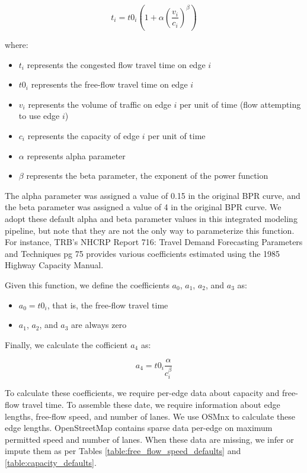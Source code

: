 \bigskip
\begin{equation}
    t_i = t0_i (1 + \alpha (\frac{v_i}{c_i}) ^ \beta)
    \label{eq:bpr_function}
\end{equation}

\bigskip
where:

\bigskip
\begin{itemize}
    \item $t_i$ represents the congested flow travel time on edge $i$
    \item $t0_i$ represents the free-flow travel time on edge $i$
    \item $v_i$ represents the volume of traffic on edge $i$ per unit of time (flow attempting to use edge $i$)
    \item $c_i$ represents the capacity of edge $i$ per unit of time
    \item $\alpha$ represents alpha parameter
    \item $\beta$ represents the beta parameter, the exponent of the power function
\end{itemize}

\bigskip
The alpha parameter was assigned a value of 0.15 in the original BPR curve, and the beta parameter was assigned a value of 4 in the original BPR curve. We adopt these default alpha and beta parameter values in this integrated modeling pipeline, but note that they are not the only way to parameterize this function. For instance, TRB's NHCRP Report 716: Travel Demand Forecasting Parameters and Techniques pg 75 provides various coefficients estimated using the 1985 Highway Capacity Manual.

\bigskip
Given this function, we define the coefficients $a_0$, $a_1$, $a_2$, and $a_3$ as:

\bigskip
\begin{itemize}
    \item $a_0 = t0_i$, that is, the free-flow travel time
    \item $a_1$, $a_2$, and $a_3$ are always zero
\end{itemize}

\bigskip
Finally, we calculate the cofficient $a_4$ as:

\begin{equation}
    a_4 = t0_i \frac{\alpha}{c_i ^ {\beta}}
    \label{eq:bpr_a4_coefficient}
\end{equation}

To calculate these coefficients, we require per-edge data about capacity and free-flow travel time. To assemble these date, we require information about edge lengths, free-flow speed, and number of lanes. We use OSMnx to calculate these edge lengths. OpenStreetMap contains sparse data per-edge on maximum permitted speed and number of lanes. When these data are missing, we infer or impute them as per Tables \ref{table:free_flow_speed_defaults} and \ref{table:capacity_defaults}.

